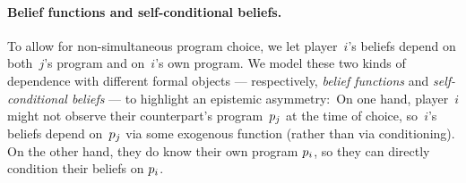 \documentclass[sigconf]{aamas}
\theoremstyle{definition}
\begin{document}
\paragraph{Belief functions and self-conditional beliefs.}
To allow for non-simultaneous program choice,
we let player~$i$'s beliefs depend on both~$j$'s program and on~$i$'s own program.
We model
these two kinds of dependence
with different formal objects --- respectively, \textit{belief functions} and \textit{self-conditional beliefs} ---
to highlight an epistemic asymmetry:\ On one hand, player~$i$ might not observe their counterpart's program~$p_j$ at the time of choice, so~$i$'s beliefs depend on~$p_j$ via some exogenous function (rather than via conditioning). On the other hand, they do know their own program $p_i$, so they can directly condition their beliefs on $p_i$. 
\end{document}
